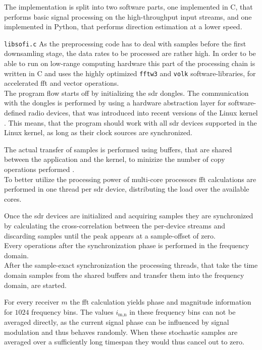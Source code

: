 The implementation is split into two software parts,
one implemented in C, that performs basic signal
processing on the high-throughput input streams, and
one implemented in Python, that performs direction estimation
at a lower speed.

\begin{subchapter}{\texttt{libsofi.c}}
  As the preprocessing code has to deal with samples
  before the first downsamling stage, the data rates to be
  processed are rather high.
  In order to be able to run on low-range computing hardware
  this part of the processing chain is written in C and
  uses the highly optimized \texttt{fftw3} and \texttt{volk}
  software-libraries, for accelerated \gls{fft} and vector operations. \\

  The program flow starts off by initializing the \gls{sdr}
  dongles. The communication with the dongles is performed
  by using a hardware abstraction layer for software-defined radio
  devices, that was introduced into recent versions of
  the Linux kernel \cite{v4lsdr}. This means, that the program should work
  with all \gls{sdr} devices supported in the Linux kernel,
  as long as their clock sources are synchronized.

  The actual transfer of samples is performed using
  buffers, that are shared between the application and
  the kernel, to minizize the number of
  copy operations performed \cite{v4lmmap}. \\

  To better utilize the processing power of multi-core processors
  \gls{fft} calculations are performed in one thread per
  \gls{sdr} device, distributing the load over the available cores.

  Once the \gls{sdr} devices are initialized and acquiring samples
  they are synchronized by calculating the
  cross-correlation between the per-device streams
  and discarding samples until the peak appears at a
  sample-offset of zero. \\

  Every operations after the synchronization phase is
  performed in the frequency domain. \\

  After the sample-exact synchronization the processing threads, that
  take the time domain samples from the shared buffers and transfer
  them into the frequency domain, are started.

  For every receiver $m$ the \gls{fft} calculation yields phase
  and magnitude information for $1024$ frequency bins.
  The values $i_\text{m,n}$ in these frequency bins can not
  be averaged directly, as the current signal phase can be
  influenced by signal modulation and thus behaves randomly.
  When these stochastic samples are averaged over a sufficiently long
  timespan they would thus cancel out to zero. \\


\end{subchapter}
